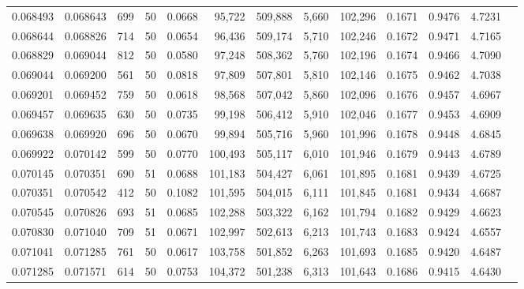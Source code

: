 \begin{tabular}{rrrrrrrrrrrrr}
0.068493 & 0.068643 &   699 &  50 &                                     0.0668 &  95,722 & 509,888 &   5,660 & 102,296 & 0.1671 & 0.9476 & 4.7231 \\
0.068644 & 0.068826 &   714 &  50 &                                     0.0654 &  96,436 & 509,174 &   5,710 & 102,246 & 0.1672 & 0.9471 & 4.7165 \\
0.068829 & 0.069044 &   812 &  50 &                                     0.0580 &  97,248 & 508,362 &   5,760 & 102,196 & 0.1674 & 0.9466 & 4.7090 \\
0.069044 & 0.069200 &   561 &  50 &                                     0.0818 &  97,809 & 507,801 &   5,810 & 102,146 & 0.1675 & 0.9462 & 4.7038 \\
0.069201 & 0.069452 &   759 &  50 &                                     0.0618 &  98,568 & 507,042 &   5,860 & 102,096 & 0.1676 & 0.9457 & 4.6967 \\
0.069457 & 0.069635 &   630 &  50 &                                     0.0735 &  99,198 & 506,412 &   5,910 & 102,046 & 0.1677 & 0.9453 & 4.6909 \\
0.069638 & 0.069920 &   696 &  50 &                                     0.0670 &  99,894 & 505,716 &   5,960 & 101,996 & 0.1678 & 0.9448 & 4.6845 \\
0.069922 & 0.070142 &   599 &  50 &                                     0.0770 & 100,493 & 505,117 &   6,010 & 101,946 & 0.1679 & 0.9443 & 4.6789 \\
0.070145 & 0.070351 &   690 &  51 &                                     0.0688 & 101,183 & 504,427 &   6,061 & 101,895 & 0.1681 & 0.9439 & 4.6725 \\
0.070351 & 0.070542 &   412 &  50 &                                     0.1082 & 101,595 & 504,015 &   6,111 & 101,845 & 0.1681 & 0.9434 & 4.6687 \\
0.070545 & 0.070826 &   693 &  51 &                                     0.0685 & 102,288 & 503,322 &   6,162 & 101,794 & 0.1682 & 0.9429 & 4.6623 \\
0.070830 & 0.071040 &   709 &  51 &                                     0.0671 & 102,997 & 502,613 &   6,213 & 101,743 & 0.1683 & 0.9424 & 4.6557 \\
0.071041 & 0.071285 &   761 &  50 &                                     0.0617 & 103,758 & 501,852 &   6,263 & 101,693 & 0.1685 & 0.9420 & 4.6487 \\
0.071285 & 0.071571 &   614 &  50 &                                     0.0753 & 104,372 & 501,238 &   6,313 & 101,643 & 0.1686 & 0.9415 & 4.6430 \\

\end{tabular}
